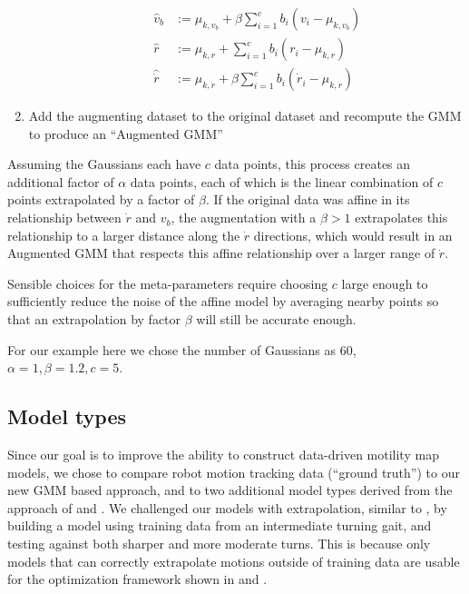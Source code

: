 \documentclass[conference]{IEEEtran}
\begin{document}
\begin{enumerate}
\begin{enumerate}
			\begin{align}
				{\hat v}_b & := \mu_{k,v_b} + \beta \sum_{i=1}^c b_i (v_i-\mu_{k,v_b}) \nonumber\\
				{\hat r} & := \mu_{k,r} + \sum_{i=1}^c b_i (r_i-\mu_{k,r}) \nonumber\\
				{\hat {\dot r}} & := \mu_{k,\dot r} + \beta \sum_{i=1}^c b_i ({\dot r}_i-\mu_{k,\dot r})
			\end{align}
	\end{enumerate}
	\item Add the augmenting dataset to the original dataset and recompute the GMM to produce an ``Augmented GMM''
\end{enumerate}

Assuming the Gaussians each have $c$ data points, this process creates an additional factor of $\alpha$ data points, each of which is the linear combination of $c$ points extrapolated by a factor of $\beta$.
If the original data was affine in its relationship between $\dot r$ and $v_b$, the augmentation with a $\beta>1$ extrapolates this relationship to a larger distance along the $\dot r$ directions, which would result in an Augmented GMM that respects this affine relationship over a larger range of $\dot r$.

Sensible choices for the meta-parameters require choosing $c$ large enough to sufficiently reduce the noise of the affine model by averaging nearby points so that an extrapolation by factor $\beta$ will still be accurate enough.

For our example here we chose the number of Gaussians as $60$, $\alpha = 1, \beta = 1.2, c = 5$.

\subsection{Model types}

Since our goal is to improve the ability to construct data-driven motility map models, we chose to compare robot motion tracking data (``ground truth'') to our new GMM based approach, and to two additional model types derived from the approach of  and .
We challenged our models with extrapolation, similar to , by building a model using training data from an intermediate turning gait, and testing against both sharper and more moderate turns.
This is because only models that can correctly extrapolate motions outside of training data are usable for the optimization framework shown in  and .
\end{document}
